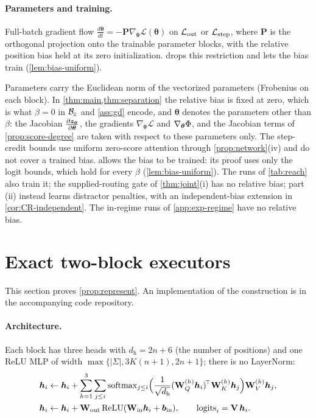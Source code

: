 \paragraph{Parameters and training.}

\begin{assumption}[Training]
\label{ass:gd}
Full-batch gradient flow $\tfrac{d\bm\theta}{dt}=-\mathbf P\nabla_{\bm\theta}\mathcal L(\bm\theta)$ on $\mathcal L_{\mathrm{out}}$ or $\mathcal L_{\mathrm{step}}$, where $\mathbf P$ is the orthogonal projection onto
the trainable parameter blocks, with the relative
position bias held at its zero initialization.  drops this restriction and lets the bias train (\cref{lem:bias-uniform}).
\end{assumption}

\label{rem:norms}Parameters carry the Euclidean norm of the vectorized parameters (Frobenius on
each block). In \cref{thm:main,thm:separation} the relative bias is fixed at zero, which is what $\beta=0$ in $\mathcal B_{\varepsilon}$ and
\cref{ass:gd} encode, and $\bm\theta$ denotes the parameters other than $\beta$: the Jacobian $\Jz$, the gradients $\nabla_{\bm\theta}\mathcal L$ and
$\nabla_{\bm\theta}\Phi$, and the Jacobian terms of \cref{prop:score-degree} are taken with respect to these parameters only. The step-credit bounds use uniform
zero-score attention through \cref{prop:network}(iv) and do not cover a trained bias.  allows the bias to be
trained: its proof uses only the logit bounds, which hold for every $\beta$ (\cref{lem:bias-uniform}). The runs of \cref{tab:reach} also train it; the supplied-routing gate of \cref{thm:joint}(i) has no relative bias; part (ii) instead learns distractor penalties, with an independent-bias extension in \cref{cor:CR-independent}. The in-regime runs of \cref{app:exp-regime} have no relative bias.


\section{Exact two-block executors}
\label{app:architectures}

This section proves \cref{prop:represent}. An implementation of the construction is in the accompanying code repository.

\paragraph{Architecture.}
\label{app:construction}
\label{app:model}
Each block has three heads with $d_{\mathrm h}=2n+6$ (the number of positions) and one ReLU MLP of width $\max\{|\Sigma|,3K(n+1),2n+1\}$;
there is no LayerNorm:
\begin{align*}
 \bm h_i&\leftarrow \bm h_i+\sum_{h=1}^{3}\sum_{j\le i}\operatorname{softmax}_{j\le i}\Bigl(\tfrac{1}{\sqrt{d_{\mathrm h}}}(\mathbf W^{(h)}_Q\bm h_i)^{\!\top}\mathbf W^{(h)}_K\bm h_j\Bigr)\mathbf W^{(h)}_V\bm h_j,\\
 \bm h_i&\leftarrow \bm h_i+\mathbf W_{\mathrm{out}}\relu(\mathbf W_{\mathrm{in}}\bm h_i+\bm b_{\mathrm{in}}),\qquad \mathrm{logits}_i=\mathbf V\,\bm h_i .
\end{align*}


